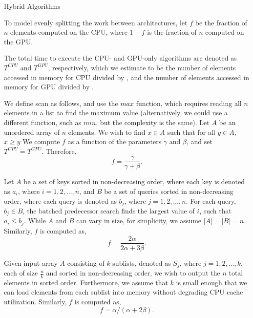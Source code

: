 \documentclass[final]{beamer}
\newlength{\colwidth}
\begin{document}
\begin{frame}[t]
\begin{columns}[t]
\begin{column}{\colwidth}
\begin{block}{Hybrid Algorithms}
\begin{description}[font=$\bullet$~\normalfont\scshape\color{red!50!black}]

\item To model evenly splitting the work between architectures, let $f$ be the fraction of $n$ elements computed on the CPU, where $1-f$ is the fraction of $n$ computed on the GPU.

\item The total time to execute the CPU- and GPU-only algorithms are denoted as $T^{CPU}$ and $T^{GPU}$, respectively, which we estimate to be the number of elements accessed in memory for CPU divided by \gamma, and the number of elements accessed in memory for GPU divided by \beta.

\end{description}

We define scan as follows, and use the $max$ function, which requires reading all $n$ elements in a list to find the maximum value (alternatively,
we could use a different function, such as $min$, but the complexity is the same).
Let $A$ be an unordered array of $n$ elements. We wish to find $x \in A$ such that for all $y \in A$, $x \ge y$%
We compute $f$ as a function of the parameters $\gamma$ and $\beta$, and set $T^{CPU}=T^{GPU}$. Therefore,
\begin{equation}f=\frac{\gamma}{\gamma+\beta}.\label{eqn:scan_split}\end{equation}


   Let $A$ be a set of keys sorted in non-decreasing order,  
   where each key is denoted as $a_i$, where $i=1, 2,\ldots,n$, and $B$ be a set of queries sorted in non-decreasing order, 
   where each query is denoted as $b_j$, where $j=1, 2,\ldots,n$. For each query, $b_j\in B$, the batched predecessor search 
   finds the largest value of $i$, such that $a_i\leq b_j$. While $A$ and $B$ can vary in size, for simplicity, we assume $|A|=|B|=n$.
   Similarly, $f$ is computed as,
\begin{equation}f=\frac{2\alpha}{2\alpha+3\beta}.\label{eqn:batch_predecessor_split}\end{equation}


   Given input array $A$ consisting of $k$ sublists, denoted as $S_j$, 
   where $j=1, 2,\ldots,k$, each of size  $\frac{n}{k}$ and sorted in non-decreasing order, we wish to output the $n$ total elements 
   in sorted order. Furthermore, we assume that $k$ is small enough that we can load elements 
   from each sublist into memory without degrading CPU cache utilization.
   Similarly, $f$ is computed as,
\begin{equation}f=\alpha/(\alpha+2\beta)\label{eqn:multiway_split}.\end{equation}


\end{block}
\end{column}
\end{columns}
\end{frame}
\end{document}
